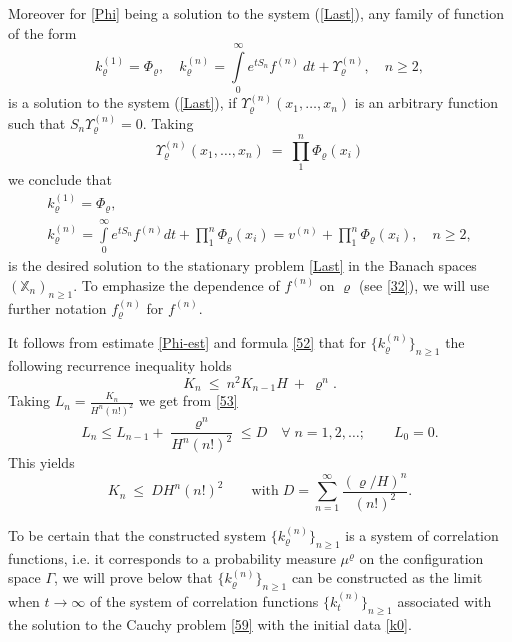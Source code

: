 \documentclass[a4paper,12pt]{article}
\newcommand{\XX}{{\mathbb X}}
\begin{document}
Moreover for \eqref{Phi} being a solution to the system
(\ref{Last}), any family of function of the form
$$
k_\varrho^{(1)} = \Phi_\varrho, \quad k^{(n)}_\varrho   =  \int\limits_0^{\infty} e^{t S_n} f^{(n)} \ dt  + \Upsilon^{(n)}_\varrho,\quad n \geq 2,
$$
is a solution to the system
(\ref{Last}), if  $\Upsilon^{(n)}_\varrho(x_1, \ldots, x_n)$ is an arbitrary function such that  $S_n \Upsilon^{(n)}_\varrho=0$. Taking
$$
\Upsilon^{(n)}_\varrho (x_1, \ldots, x_n) \ = \ \prod_{1}^{n} \Phi_\varrho(x_i)
$$
we conclude that
\begin{equation}\label{52}
\begin{array}{l}
k^{(1)}_\varrho = \Phi_\varrho,
\\[2mm]
k^{(n)}_\varrho = \int\limits_0^{\infty} e^{t  S_n} f^{(n)} dt  +  \prod\limits_{1}^{n} \Phi_\varrho(x_i) = v^{(n)}+\prod\limits_{1}^{n} \Phi_\varrho(x_i),\quad n\geq 2,
\end{array}
\end{equation}
is the desired solution to the stationary problem \eqref{Last} in the Banach spaces $(\XX_{n})_{n\geq 1}$.
To emphasize the dependence of $f^{(n)}$ on $\varrho$ (see \eqref{32}), we will use further notation $f_{\varrho}^{(n)}$  for $f^{(n)}$.

It follows from estimate \eqref{Phi-est} and formula \eqref{52} that for $\{ k_{\varrho}^{(n)} \}_{n\geq 1}$ the following recurrence inequality holds
\begin{equation}\label{53}
K_n \ \le \  n^2 K_{n-1} H \ + \ \varrho^n.
\end{equation}
Taking $L_n = \frac{K_n}{H^n (n!)^2}$ we get from \eqref{53}
$$
L_n \le L_{n-1}+ \frac{\varrho^n}{H^n (n!)^2} \le D \quad \forall \; n=1,2, \ldots; \qquad L_0=0.
$$
This yields
\begin{equation}\label{55}
K_n \ \le \ D H^n (n!)^2 \qquad \mbox{with} \; D = \sum\limits_{n=1}^{\infty} \frac{(\varrho / H)^n}{(n!)^2}.
\end{equation}
\medskip

To be certain that the constructed system $\{ k_{\varrho}^{(n)} \}_{n\geq 1}$ is a system of correlation functions, i.e. it corresponds to a probability measure $\mu^\varrho$ on the configuration space $\Gamma$, we will
prove below that $\{ k_{\varrho}^{(n)} \}_{n\geq 1}$ can be constructed as the limit when $t \to \infty$ of the system
of correlation functions $\{ k_{t}^{(n)}\}_{n\geq 1}$ associated with the solution to the Cauchy problem \eqref{59} with
the initial data \eqref{k0}.
\end{document}
